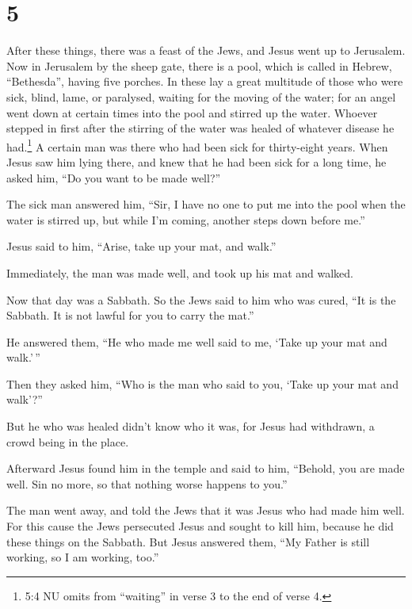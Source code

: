 \hypertarget{section-4}{%
\section{5}\label{section-4}}

 After these things, there was a feast of the Jews, and
Jesus went up to Jerusalem.  Now in Jerusalem by the sheep
gate, there is a pool, which is called in Hebrew, ``Bethesda'', having
five porches.  In these lay a great multitude of those who
were sick, blind, lame, or paralysed, waiting for the moving of the
water;  for an angel went down at certain times into the
pool and stirred up the water. Whoever stepped in first after the
stirring of the water was healed of whatever disease he had.\footnote{5:4
  NU omits from ``waiting'' in verse 3 to the end of verse 4.}
 A certain man was there who had been sick for thirty-eight
years.  When Jesus saw him lying there, and knew that he had
been sick for a long time, he asked him, ``Do you want to be made
well?''

 The sick man answered him, ``Sir, I have no one to put me
into the pool when the water is stirred up, but while I'm coming,
another steps down before me.''

 Jesus said to him, ``Arise, take up your mat, and walk.''

 Immediately, the man was made well, and took up his mat and
walked.

Now that day was a Sabbath.  So the Jews said to him who
was cured, ``It is the Sabbath. It is not lawful for you to carry the
mat.''

 He answered them, ``He who made me well said to me, `Take
up your mat and walk.'\,''

 Then they asked him, ``Who is the man who said to you,
`Take up your mat and walk'?''

 But he who was healed didn't know who it was, for Jesus
had withdrawn, a crowd being in the place.

 Afterward Jesus found him in the temple and said to him,
``Behold, you are made well. Sin no more, so that nothing worse happens
to you.''

 The man went away, and told the Jews that it was Jesus who
had made him well.  For this cause the Jews persecuted
Jesus and sought to kill him, because he did these things on the
Sabbath.  But Jesus answered them, ``My Father is still
working, so I am working, too.''

